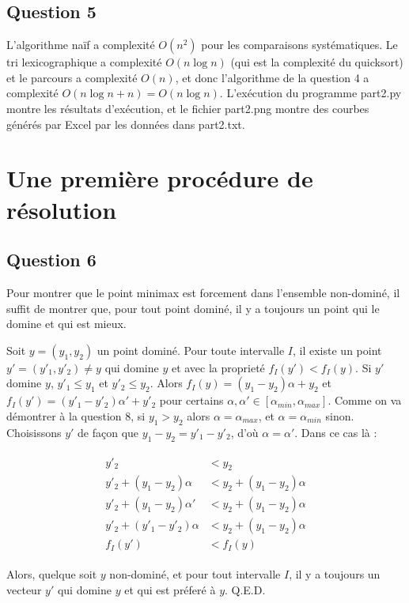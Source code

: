 \documentclass[paper=a4, fontsize=11pt]{scrartcl} %
\numberwithin{equation}{section} %
\numberwithin{figure}{section} %
\numberwithin{table}{section} %
\begin{document}
\subsection{Question 5}
L'algorithme na\"if a complexit\'e $O(n^2)$ pour les comparaisons syst\'ematiques. Le tri lexicographique a complexit\'e $O(n\log n)$ (qui est la complexit\'e du quicksort) et le parcours a complexit\'e $O(n)$, et donc l'algorithme de la question 4 a complexit\'e $O(n\log n + n) = O(n\log n)$. L'ex\'ecution du programme part2.py montre les r\'esultats d'ex\'ecution, et le fichier part2.png montre des courbes g\'en\'er\'es par Excel par les donn\'ees dans part2.txt.

\section{Une premi\`ere proc\'edure de r\'esolution}
\subsection{Question 6}
Pour montrer que le point minimax est forcement dans l'ensemble non-domin\'e, il suffit de montrer que, pour tout point domin\'e, il y a toujours un point qui le domine et qui est mieux.

Soit $y = (y_1,y_2)$ un point domin\'e. Pour toute intervalle $I$, il existe un point $y' = (y'_1, y'_2) \neq y$ qui domine $y$ et avec la propriet\'e $f_I(y') < f_I(y)$. Si $y'$ domine $y$, $y'_1 \leq y_1$ et $y'_2 \leq y_2$. Alors $f_I(y) = (y_1-y_2)\alpha + y_2$ et $f_I(y') = (y'_1-y'_2)\alpha'+y'_2$ pour certains $\alpha, \alpha'\in [\alpha_{min},\alpha_{max}]$. Comme on va d\'emontrer \`a la question 8, si $y_1>y_2$ alors $\alpha = \alpha_{max}$, et $\alpha=\alpha_{min}$ sinon. Choisissons $y'$ de fa\c con que $y_1-y_2 = y'_1-y'_2$, d'o\`u $\alpha = \alpha'$. Dans ce cas l\`a :

\begin{align}
\begin{split}
y'_2 &< y_2 \\
y'_2 + (y_1-y_2)\alpha &< y_2 + (y_1-y_2)\alpha\\
y'_2 + (y_1-y_2)\alpha' &< y_2 + (y_1-y_2)\alpha\\
y'_2 + (y'_1-y'_2)\alpha &< y_2 + (y_1-y_2)\alpha\\
f_I(y') &< f_I(y)
\end{split}
\end{align}

Alors, quelque soit $y$ non-domin\'e, et pour tout intervalle $I$, il y a toujours un vecteur $y'$ qui domine $y$ et qui est pr\'efer\'e \`a $y$. Q.E.D.
\end{document}
